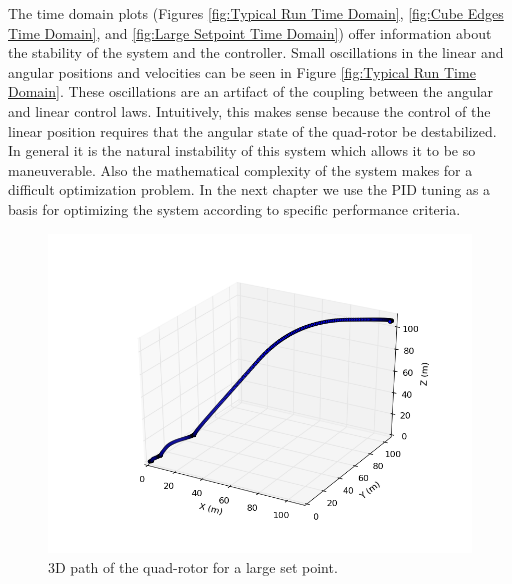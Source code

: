 The time domain plots (Figures     \ref{fig:Typical Run Time Domain},   \ref{fig:Cube Edges Time Domain}, and \ref{fig:Large Setpoint Time Domain}) offer information about the stability of the system and the controller. Small oscillations in the linear and angular positions and velocities can be seen in Figure \ref{fig:Typical Run Time Domain}. These oscillations are an artifact of the coupling between the angular and linear control laws. Intuitively, this makes sense because the control of the linear position requires that the angular state of the quad-rotor be destabilized. In general it is the natural instability of this system which allows it to be so maneuverable. Also the mathematical complexity of the system makes for a difficult optimization problem. In the next chapter we use the PID tuning as a basis for optimizing the system according to specific performance criteria.
\begin{figure}[htbp]
	\centering
		\includegraphics[scale = 0.4]{Figures/largeSetpointDifferencesTest_3d.png}
	\caption[3D path of the quad-rotor for a large set point.]{3D path of the quad-rotor for a large set point.}
	\label{fig:Large Setpoints 3D Path}
\end{figure}
